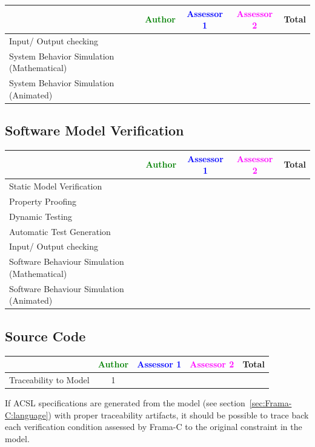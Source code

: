 \begin{tabular}{|l | c | c | c | c|}
\hline
& \textcolor{green}{Author} & \textcolor{blue}{Assessor 1} & \textcolor{magenta}{Assessor 2} & Total \\
\hline 
Input/ Output checking & & & &  \\
\hline
System Behavior Simulation (Mathematical) & & & &  \\
\hline
System Behavior Simulation (Animated) & & & &  \\
\hline
\end{tabular}


\subsection{Software Model Verification	}


\begin{tabular}{|l | c | c | c | c|}
\hline
& \textcolor{green}{Author} & \textcolor{blue}{Assessor 1} & \textcolor{magenta}{Assessor 2} & Total \\
\hline 
Static Model Verification & & & &  \\
\hline
Property Proofing & & & &  \\
\hline
Dynamic Testing & & & &  \\
\hline
Automatic Test Generation & & & &  \\
\hline
Input/ Output checking & & & &  \\
\hline
Software Behaviour Simulation (Mathematical) & & & &  \\
\hline
Software Behaviour Simulation (Animated) & & & &  \\
\hline
\end{tabular}


\subsection{Source Code}


\begin{tabular}{|l | c | c | c | c|}
\hline
& \textcolor{green}{Author} & \textcolor{blue}{Assessor 1} & \textcolor{magenta}{Assessor 2} & Total \\
\hline 
Traceability to Model & 1 & & &  \\
\hline
\end{tabular}

\begin{author_comment}
  If ACSL specifications are generated from the model (see
  section~\ref{sec:Frama-C:language}) with proper traceability
  artifacts, it should be possible to trace back each verification
  condition assessed by Frama-C to the original constraint in the
  model.
\end{author_comment}

